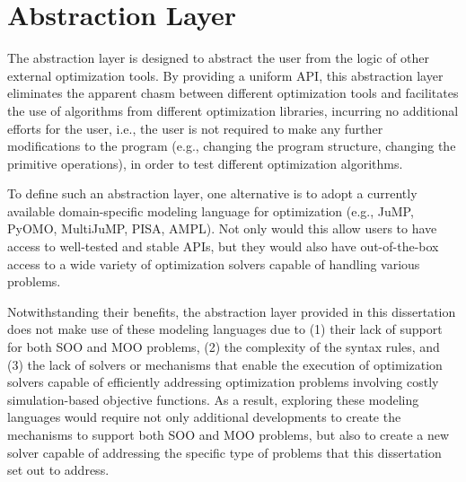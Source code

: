 

\section{Abstraction Layer}
The abstraction layer is designed to abstract the user from the logic of other external optimization tools. By providing a uniform \ac{API}, this abstraction layer eliminates the apparent chasm between different optimization tools and facilitates the use of algorithms from different optimization libraries, incurring no additional efforts for the user, i.e., the user is not required to make any further modifications to the program (e.g., changing the program structure, changing the primitive operations), in order to test different optimization algorithms. 

To define such an abstraction layer, one alternative is to adopt a currently available domain-specific modeling language for optimization (e.g., JuMP, PyOMO, MultiJuMP, PISA, AMPL). Not only would this allow users to have access to well-tested and stable \acp{API}, but they would also have out-of-the-box access to a wide variety of optimization solvers capable of handling various problems. 

Notwithstanding their benefits, the abstraction layer provided in this dissertation does not make use of these modeling languages due to (1) their lack of support for both \ac{SOO} and \ac{MOO} problems, (2) the complexity of the syntax rules, and (3) the lack of solvers or mechanisms that enable the execution of optimization solvers capable of efficiently addressing optimization problems involving costly simulation-based objective functions. As a result, exploring these modeling languages would require not only additional developments to create the mechanisms to support both \ac{SOO} and \ac{MOO} problems, but also to create a new solver capable of addressing the specific type of problems that this dissertation set out to address. 

